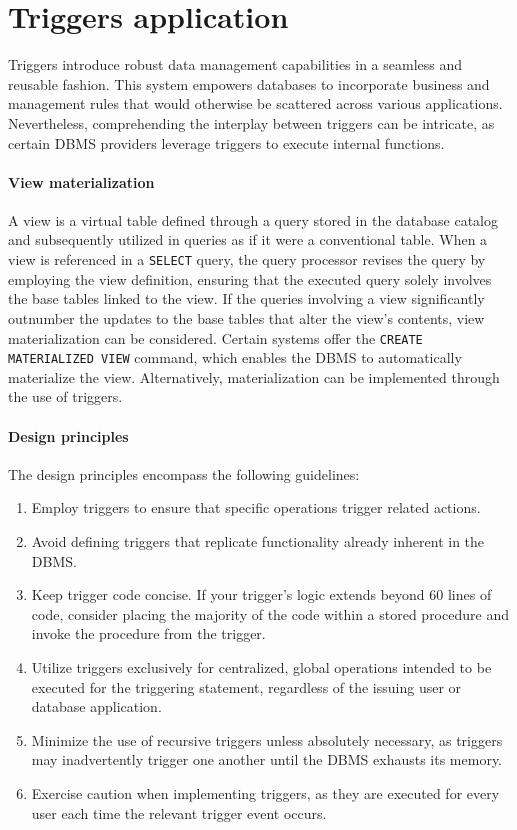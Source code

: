 \section{Triggers application}

Triggers introduce robust data management capabilities in a seamless and reusable fashion. 
This system empowers databases to incorporate business and management rules that would otherwise be scattered across various applications. 
Nevertheless, comprehending the interplay between triggers can be intricate, as certain DBMS  providers leverage triggers to execute internal functions.

\paragraph*{View materialization}
A view is a virtual table defined through a query stored in the database catalog and subsequently utilized in queries as if it were a conventional table. 
When a view is referenced in a \texttt{SELECT} query, the query processor revises the query by employing the view definition, ensuring that the executed query solely involves the base tables linked to the view.   
If the queries involving a view significantly outnumber the updates to the base tables that alter the view's contents, view materialization can be considered.  
Certain systems offer the \texttt{CREATE MATERIALIZED VIEW} command, which enables the DBMS to automatically materialize the view. 
Alternatively, materialization can be implemented through the use of triggers.

\paragraph*{Design principles}
The design principles encompass the following guidelines:
\begin{enumerate}
    \item Employ triggers to ensure that specific operations trigger related actions.
    \item Avoid defining triggers that replicate functionality already inherent in the DBMS. 
    \item Keep trigger code concise. 
        If your trigger's logic extends beyond 60 lines of code, consider placing the majority of the code within a stored procedure and invoke the procedure from the trigger.
    \item Utilize triggers exclusively for centralized, global operations intended to be executed for the triggering statement, regardless of the issuing user or database application.
    \item Minimize the use of recursive triggers unless absolutely necessary, as triggers may inadvertently trigger one another until the DBMS exhausts its memory.
    \item Exercise caution when implementing triggers, as they are executed for every user each time the relevant trigger event occurs.
\end{enumerate}

